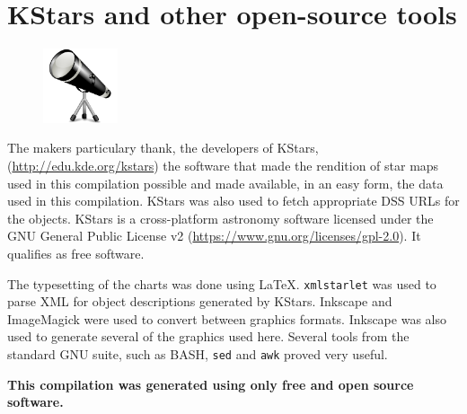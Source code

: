 \section*{KStars and other open-source tools}
\begin{figure}
\centering
\includegraphics[width=0.195\textwidth]{kstars.pdf}
\end{figure}
The makers particulary thank, the developers of KStars,
(\url{http://edu.kde.org/kstars}) the software that made the rendition
of star maps used in this compilation possible and made available, in
an easy form, the data used in this compilation. KStars was also used
to fetch appropriate DSS URLs for the objects. KStars is a
cross-platform astronomy software licensed under the GNU General
Public License v2 (\url{https://www.gnu.org/licenses/gpl-2.0}). It
qualifies as free software.

The typesetting of the charts was done using
\LaTeX. \texttt{xmlstarlet} was used to parse XML for object
descriptions generated by KStars. Inkscape and ImageMagick were used
to convert between graphics formats. Inkscape was also used to
generate several of the graphics used here. Several tools from the
standard GNU suite, such as BASH, \texttt{sed} and \texttt{awk} proved
very useful.

\textbf{This compilation was generated using only free and open source
software.}
